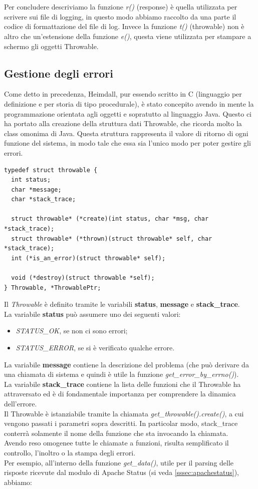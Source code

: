 \documentclass[italian]{tktltiki2}
\begin{document}
\\
\\
Per concludere descriviamo la funzione \emph{r()} (response) è quella utilizzata per scrivere sui file di logging, in questo modo abbiamo raccolto da una parte il codice di formattazione del file di log. Invece la funzione \emph{t()} (throwable) non è altro che un'estensione della funzione \emph{e()}, questa viene utilizzata per stampare a schermo gli oggetti Throwable.

\subsection{Gestione degli errori}
\label{sec:errors}
Come detto in precedenza, Heimdall, pur essendo scritto in C (linguaggio per definizione e per storia di tipo procedurale), è stato concepito avendo in mente la programmazione orientata agli oggetti e sopratutto al linguaggio Java. Questo ci ha portato alla creazione della struttura dati Throwable, che ricorda molto la class omonima di Java\cite{throwable_java}.
Questa struttura rappresenta il valore di ritorno di ogni funzione del sistema, in modo tale che essa sia l'unico modo per poter gestire gli errori.
\begin{lstlisting}
typedef struct throwable {
  int status;
  char *message;
  char *stack_trace;

  struct throwable* (*create)(int status, char *msg, char *stack_trace);
  struct throwable* (*thrown)(struct throwable* self, char *stack_trace);
  int (*is_an_error)(struct throwable* self);
  
  void (*destroy)(struct throwable *self);
} Throwable, *ThrowablePtr;
\end{lstlisting} 
Il \emph{Throwable} è definito tramite le variabili \textbf{status}, \textbf{message} e \textbf{stack\_trace}.
\\
La variabile \textbf{status} può assumere uno dei seguenti valori:
\begin{itemize}
  \item \emph{STATUS\_OK}, se non ci sono errori;
  \item \emph{STATUS\_ERROR}, se si è verificato qualche errore.
\end{itemize}
La variabile \textbf{message} contiene la descrizione del problema (che può derivare da una chiamata di sistema e quindi è utile la funzione \emph{get\_error\_by\_errno()}).
\\
La variabile \textbf{stack\_trace} contiene la lista delle funzioni che il Throwable ha attraversato ed è di fondamentale importanza per comprendere la dinamica dell'errore.
\\
Il Throwable è istanziabile tramite la chiamata \emph{get\_throwable().create()}, a cui vengono passati i parametri sopra descritti. In particolar modo, stack\_trace conterrà solamente il nome della funzione che sta invocando la chiamata.
\\
Avendo reso omogenee tutte le chiamate a funzioni, risulta semplificato il controllo, l'inoltro o la stampa degli errori.
\\
Per esempio, all'interno della funzione \emph{get\_data()}, utile per il parsing delle risposte ricevute dal modulo di Apache Status (si veda \ref{sssec:apachestatus}), abbiamo:
\end{document}
